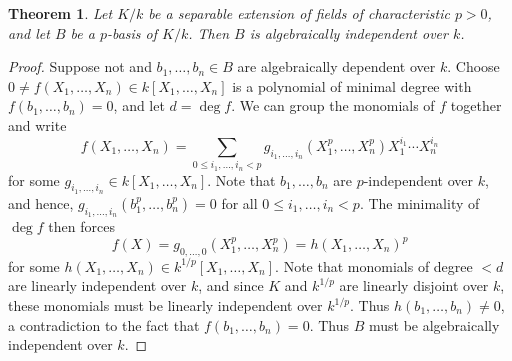 \documentclass[10pt]{article}
\theoremstyle{thmstyle}
\newtheorem{theorem}{Theorem}[section]
\theoremstyle{defstyle}
\renewcommand{\le}{\leqslant}
\begin{document}
\begin{theorem}
    Let $K/k$ be a separable extension of fields of characteristic $p > 0$, and let $B$ be a $p$-basis of $K/k$. Then $B$ is algebraically independent over $k$.
\end{theorem}
\begin{proof}
    Suppose not and $b_1,\dots,b_n\in B$ are algebraically dependent over $k$. Choose $0\ne f(X_1,\dots,X_n)\in k[X_1,\dots,X_n]$ is a polynomial of minimal degree with $f(b_1,\dots,b_n) = 0$, and let $d = \deg f$. We can group the monomials of $f$ together and write 
    \begin{equation*}
        f(X_1,\dots,X_n) = \sum_{0\le i_1,\dots, i_n < p} g_{i_1,\dots,i_n}(X_1^p,\dots,X_n^p) X_1^{i_1}\cdots X_n^{i_n}
    \end{equation*}
    for some $g_{i_1,\dots,i_n}\in k[X_1,\dots,X_n]$. Note that $b_1,\dots,b_n$ are $p$-independent over $k$, and hence, $g_{i_1,\dots,i_n}(b_1^p,\dots,b_n^p) = 0$ for all $0\le i_1,\dots,i_n < p$. The minimality of $\deg f$ then forces 
    \begin{equation*}
        f(X) = g_{0,\dots,0}(X_1^p,\dots,X_n^p) = h(X_1,\dots,X_n)^p
    \end{equation*}
    for some $h(X_1,\dots,X_n)\in k^{1/p}[X_1,\dots,X_n]$. Note that monomials of degree $< d$ are linearly independent over $k$, and since $K$ and $k^{1/p}$ are linearly disjoint over $k$, these monomials must be linearly independent over $k^{1/p}$. Thus $h(b_1,\dots,b_n)\ne 0$, a contradiction to the fact that $f(b_1,\dots,b_n) = 0$. Thus $B$ must be algebraically independent over $k$.
\end{proof}
\end{document}
